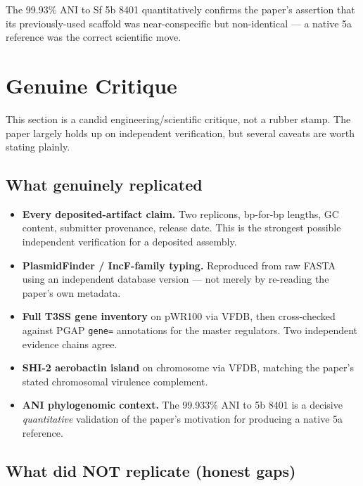 \documentclass[11pt]{article}
\begin{document}
The 99.93\% ANI to Sf 5b 8401 quantitatively confirms the paper's assertion that its
previously-used scaffold was near-conspecific but non-identical --- a native 5a reference was the
correct scientific move.

\section{Genuine Critique}

This section is a candid engineering/scientific critique, not a rubber stamp. The paper largely
holds up on independent verification, but several caveats are worth stating plainly.

\subsection{What genuinely replicated}

\begin{itemize}[nosep]
  \item \textbf{Every deposited-artifact claim.} Two replicons, bp-for-bp lengths, GC content,
    submitter provenance, release date. This is the strongest possible independent verification
    for a deposited assembly.
  \item \textbf{PlasmidFinder / IncF-family typing.} Reproduced from raw FASTA using an
    independent database version --- not merely by re-reading the paper's own metadata.
  \item \textbf{Full T3SS gene inventory} on pWR100 via VFDB, then cross-checked against PGAP
    \texttt{gene=} annotations for the master regulators. Two independent evidence chains agree.
  \item \textbf{SHI-2 aerobactin island} on chromosome via VFDB, matching the paper's stated
    chromosomal virulence complement.
  \item \textbf{ANI phylogenomic context.} The 99.933\% ANI to 5b 8401 is a decisive
    \textit{quantitative} validation of the paper's motivation for producing a native 5a reference.
\end{itemize}

\subsection{What did NOT replicate (honest gaps)}
\end{document}
